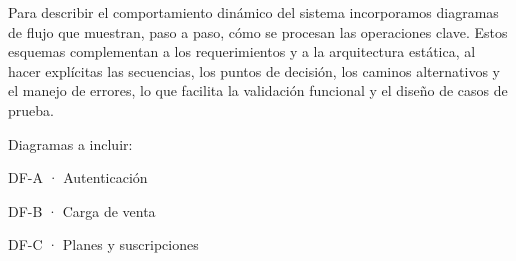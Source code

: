 Para describir el comportamiento dinámico del sistema incorporamos diagramas de flujo que muestran, paso a paso, cómo se procesan las operaciones clave. Estos esquemas complementan a los requerimientos y a la arquitectura estática, al hacer explícitas las secuencias, los puntos de decisión, los caminos alternativos y el manejo de errores, lo que facilita la validación funcional y el diseño de casos de prueba.

Diagramas a incluir:

DF-A · Autenticación

DF-B · Carga de venta

DF-C · Planes y suscripciones

